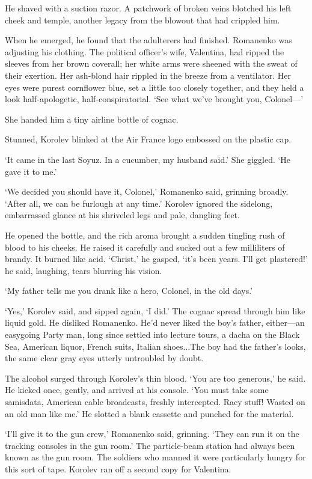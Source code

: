 He shaved with a suction razor. A patchwork of broken veins blotched his left cheek and temple, another legacy from the blowout that had crippled him.

When he emerged, he found that the adulterers had finished. Romanenko was adjusting his clothing. The political officer's wife, Valentina, had ripped the sleeves from her brown coverall; her white arms were sheened with the sweat of their exertion. Her ash-blond hair rippled in the breeze from a ventilator. Her eyes were purest cornflower blue, set a little too closely together, and they held a look half-apologetic, half-conspiratorial. `See what we've brought you, Colonel---'

She handed him a tiny airline bottle of cognac.

Stunned, Korolev blinked at the Air France logo embossed on the plastic cap.

`It came in the last Soyuz. In a cucumber, my husband said.' She giggled. `He gave it to me.'

`We decided you should have it, Colonel,' Romanenko said, grinning broadly. `After all, we can be furlough at any time.' Korolev ignored the sidelong, embarrassed glance at his shriveled legs and pale, dangling feet.

He opened the bottle, and the rich aroma brought a sudden tingling rush of blood to his cheeks. He raised it carefully and sucked out a few milliliters of brandy. It burned like acid. `Christ,' he gasped, `it's been years. I'll get plastered!' he said, laughing, tears blurring his vision.

`My father tells me you drank like a hero, Colonel, in the old days.'

`Yes,' Korolev said, and sipped again, `I did.' The cognac spread through him like liquid gold. He disliked Romanenko. He'd never liked the boy's father, either---an easygoing Party man, long since settled into lecture tours, a dacha on the Black Sea, American liquor, French suits, Italian shoes...The boy had the father's looks, the same clear gray eyes utterly untroubled by doubt.

The alcohol surged through Korolev's thin blood. `You are too generous,' he said. He kicked once, gently, and arrived at his console. `You must take some samisdata, American cable broadcasts, freshly intercepted. Racy stuff! Wasted on an old man like me.' He slotted a blank cassette and punched for the material.

`I'll give it to the gun crew,' Romanenko said, grinning. `They can run it on the tracking consoles in the gun room.' The particle-beam station had always been known as the gun room. The soldiers who manned it were particularly hungry for this sort of tape. Korolev ran off a second copy for Valentina.

